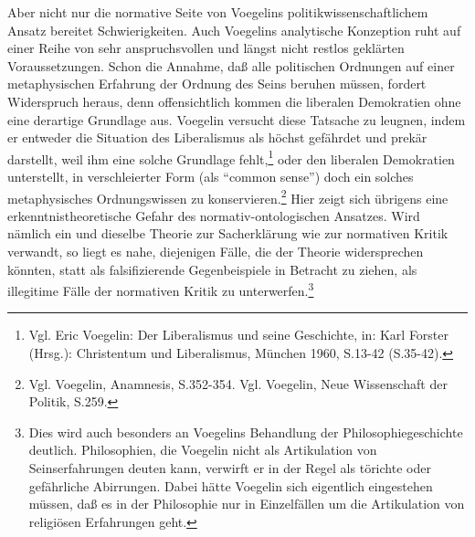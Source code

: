 Aber nicht nur die normative Seite von Voegelins politikwissenschaftlichem
Ansatz bereitet Schwierigkeiten. Auch Voegelins analytische Konzeption ruht
auf einer Reihe von sehr anspruchsvollen und längst nicht restlos geklärten
Voraussetzungen. Schon die Annahme, daß alle politischen Ordnungen auf einer
metaphysischen Erfahrung der Ordnung des Seins beruhen müssen, fordert
Widerspruch heraus, denn offensichtlich kommen die liberalen Demokratien ohne
eine derartige Grundlage aus. Voegelin versucht diese Tatsache zu leugnen,
indem er entweder die Situation des Liberalismus als höchst gefährdet und
prekär darstellt, weil ihm eine solche Grundlage fehlt,\footnote{Vgl. Eric
  Voegelin: Der Liberalismus und seine Geschichte, in: Karl Forster (Hrsg.):
  Christentum und Liberalismus, München 1960, S.13-42 (S.35-42).} oder den
liberalen Demokratien unterstellt, in verschleierter Form (als "`common
sense"') doch ein solches metaphysisches Ordnungswissen zu
konservieren.\footnote{Vgl. Voegelin, Anamnesis, S.352-354. Vgl. Voegelin,
  Neue Wissenschaft der Politik, S.259.}  Hier zeigt sich übrigens eine
erkenntnistheoretische Gefahr des normativ-ontologischen Ansatzes. Wird
nämlich ein und dieselbe Theorie zur Sacherklärung wie zur normativen Kritik
verwandt, so liegt es nahe, diejenigen Fälle, die der Theorie widersprechen
könnten, statt als falsifizierende Gegenbeispiele in Betracht zu ziehen, als
illegitime Fälle der normativen Kritik zu unterwerfen.\footnote{Dies wird auch
  besonders an Voegelins Behandlung der Philosophiegeschichte deutlich.
  Philosophien, die Voegelin nicht als Artikulation von Seinserfahrungen
  deuten kann, verwirft er in der Regel als törichte oder gefährliche
  Abirrungen. Dabei hätte Voegelin sich eigentlich eingestehen müssen, daß es
  in der Philosophie nur in Einzelfällen um die Artikulation von religiösen
  Erfahrungen geht.}

